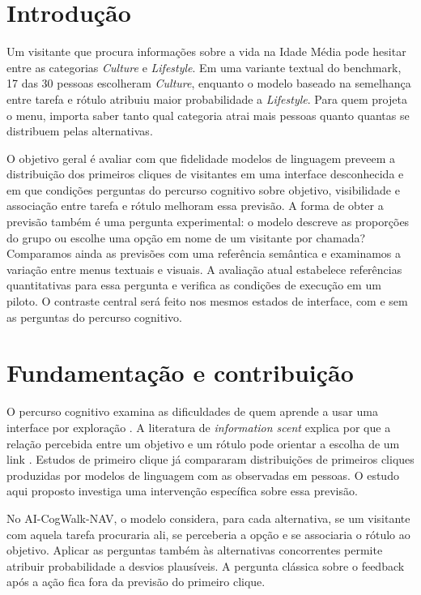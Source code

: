 \documentclass[12pt]{article}
\begin{document}
\section{Introdução}

Um visitante que procura informações sobre a vida na Idade Média pode hesitar entre as categorias \emph{Culture} e \emph{Lifestyle}. Em uma variante textual do benchmark, 17 das 30 pessoas escolheram \emph{Culture}, enquanto o modelo baseado na semelhança entre tarefa e rótulo atribuiu maior probabilidade a \emph{Lifestyle}. Para quem projeta o menu, importa saber tanto qual categoria atrai mais pessoas quanto quantas se distribuem pelas alternativas.

O objetivo geral é avaliar com que fidelidade modelos de linguagem preveem a distribuição dos primeiros cliques de visitantes em uma interface desconhecida e em que condições perguntas do percurso cognitivo sobre objetivo, visibilidade e associação entre tarefa e rótulo melhoram essa previsão. A forma de obter a previsão também é uma pergunta experimental: o modelo descreve as proporções do grupo ou escolhe uma opção em nome de um visitante por chamada? Comparamos ainda as previsões com uma referência semântica e examinamos a variação entre menus textuais e visuais. A avaliação atual estabelece referências quantitativas para essa pergunta e verifica as condições de execução em um piloto. O contraste central será feito nos mesmos estados de interface, com e sem as perguntas do percurso cognitivo.

\section{Fundamentação e contribuição}

O percurso cognitivo examina as dificuldades de quem aprende a usar uma interface por exploração \cite{polson1992cw,wharton1994cw}. A literatura de \emph{information scent} explica por que a relação percebida entre um objetivo e um rótulo pode orientar a escolha de um link \cite{pirolli1999foraging,fu2007snifact}. Estudos de primeiro clique \cite{kuric2026wwgc} já compararam distribuições de primeiros cliques produzidas por modelos de linguagem com as observadas em pessoas. O estudo aqui proposto investiga uma intervenção específica sobre essa previsão.

No AI-CogWalk-NAV, o modelo considera, para cada alternativa, se um visitante com aquela tarefa procuraria ali, se perceberia a opção e se associaria o rótulo ao objetivo. Aplicar as perguntas também às alternativas concorrentes permite atribuir probabilidade a desvios plausíveis. A pergunta clássica sobre o feedback após a ação fica fora da previsão do primeiro clique.
\end{document}
